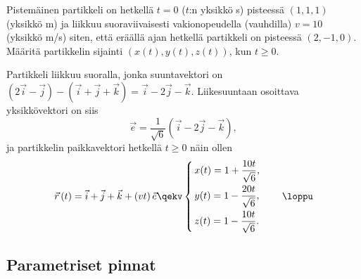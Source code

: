 \begin{Exa} Pistemäinen partikkeli on hetkellä $t=0$ ($t$:n yksikkö s) pisteessä $(1,1,1)$ 
(yksikkö m) ja liikkuu suoraviivaisesti vakionopeudella (vauhdilla) $v=10$ (yksikkö m/s)
siten, että eräällä ajan hetkellä partikkeli on pisteessä $(2,-1,0)$. Määritä partikkelin
sijainti $(x(t),y(t),z(t))$, kun $t \ge 0$. 
\end{Exa}
\ratk Partikkeli liikkuu suoralla, jonka suuntavektori on 
$(2\vec{i}-\vec{j})-(\vec{i}+\vec{j}+\vec{k})=\vec{i}-2\vec{j}-\vec{k}$. Liikesuuntaan
osoittava yksikkövektori on siis
\[ 
\vec{e} = \dfrac{1}{\sqrt{6}}(\vec{i}-2\vec{j}-\vec{k}),
\]
ja partikkelin paikkavektori hetkellä $t \ge 0$ näin ollen
\[
\vec{r}\,(t) = \vec{i}+\vec{j}+\vec{k} + (vt)\,\vec{e} \qekv
               \begin{cases} 
                \,x(t) = 1 + \dfrac{10t}{\sqrt{6}}, \\[3mm] 
                \,y(t) = 1 - \dfrac{20t}{\sqrt{6}}, \\[3mm] 
                \,z(t) = 1 - \dfrac{10t}{\sqrt{6}}.
               \end{cases} \quad\loppu
\]

\subsection{Parametriset pinnat}

